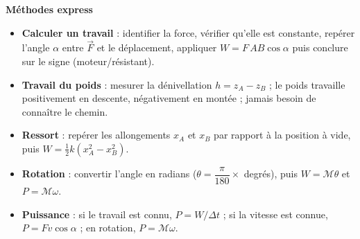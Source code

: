 \documentclass[11pt]{article}
\begin{document}
\begin{bilan}
\textbf{Méthodes express}
\begin{itemize}
\item \textbf{Calculer un travail} : identifier la force, vérifier qu'elle est constante, repérer l'angle $\alpha$ entre $\vec{F}$ et le déplacement, appliquer $W=F\,AB\cos\alpha$ puis conclure sur le signe (moteur/résistant).
\item \textbf{Travail du poids} : mesurer la dénivellation $h=z_A-z_B$ ; le poids travaille positivement en descente, négativement en montée ; jamais besoin de connaître le chemin.
\item \textbf{Ressort} : repérer les allongements $x_A$ et $x_B$ par rapport à la position à vide, puis $W=\tfrac12 k(x_A^2-x_B^2)$.
\item \textbf{Rotation} : convertir l'angle en radians ($\theta=\dfrac{\pi}{180}\times$ degrés), puis $W=\mathcal{M}\theta$ et $P=\mathcal{M}\omega$.
\item \textbf{Puissance} : si le travail est connu, $P=W/\Delta t$ ; si la vitesse est connue, $P=Fv\cos\alpha$ ; en rotation, $P=\mathcal{M}\omega$.
\end{itemize}
\end{bilan}
\end{document}
